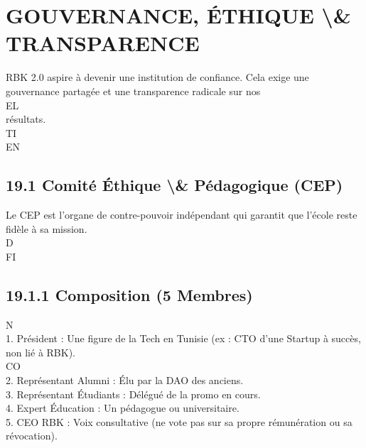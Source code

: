 \documentclass[12pt,landscape,a4paper]{article}
\begin{document}
\section{GOUVERNANCE, ÉTHIQUE \textbackslash{}& TRANSPARENCE}
\vspace{0.5em}
\vspace{0.5em}
RBK 2.0 aspire à devenir une institution de confiance. Cela exige une gouvernance partagée et une transparence radicale sur nos\\
\vspace{0.5em}
\vspace{0.5em}
\vspace{0.5em}
\vspace{0.5em}
EL\\
résultats.\\
\vspace{0.5em}
\vspace{0.5em}
\vspace{0.5em}
\vspace{0.5em}
TI\\
EN\\
\subsection{19.1 Comité Éthique \textbackslash{}& Pédagogique (CEP)}
Le CEP est l’organe de contre-pouvoir indépendant qui garantit que l’école reste fidèle à sa mission.\\
\vspace{0.5em}
\vspace{0.5em}
\vspace{0.5em}
\vspace{0.5em}
D\\
FI\\
\subsection{19.1.1 Composition (5 Membres)}
\vspace{0.5em}
N\\
1. Président : Une figure de la Tech en Tunisie (ex : CTO d’une Startup à succès, non lié à RBK).\\
CO\\
2. Représentant Alumni : Élu par la DAO des anciens.\\
\vspace{0.5em}
3. Représentant Étudiants : Délégué de la promo en cours.\\
\vspace{0.5em}
4. Expert Éducation : Un pédagogue ou universitaire.\\
\vspace{0.5em}
5. CEO RBK : Voix consultative (ne vote pas sur sa propre rémunération ou sa révocation).\\
\vspace{0.5em}
\vspace{0.5em}
\end{document}
